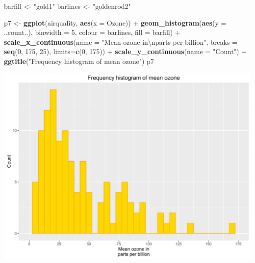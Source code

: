 \documentclass[]{article}
\newenvironment{Shaded}{\begin{snugshade}}{\end{snugshade}}
\newcommand{\KeywordTok}[1]{\textcolor[rgb]{0.13,0.29,0.53}{\textbf{{#1}}}}
\newcommand{\DataTypeTok}[1]{\textcolor[rgb]{0.13,0.29,0.53}{{#1}}}
\newcommand{\DecValTok}[1]{\textcolor[rgb]{0.00,0.00,0.81}{{#1}}}
\newcommand{\CharTok}[1]{\textcolor[rgb]{0.31,0.60,0.02}{{#1}}}
\newcommand{\StringTok}[1]{\textcolor[rgb]{0.31,0.60,0.02}{{#1}}}
\newcommand{\NormalTok}[1]{{#1}}
\begin{document}
\begin{Shaded}
\begin{Highlighting}[]
\NormalTok{barfill <-}\StringTok{ "gold1"}
\NormalTok{barlines <-}\StringTok{ "goldenrod2"}

\NormalTok{p7 <-}\StringTok{ }\KeywordTok{ggplot}\NormalTok{(airquality, }\KeywordTok{aes}\NormalTok{(}\DataTypeTok{x =} \NormalTok{Ozone)) +}\StringTok{ }
\StringTok{      }\KeywordTok{geom_histogram}\NormalTok{(}\KeywordTok{aes}\NormalTok{(}\DataTypeTok{y =} \NormalTok{..count..), }\DataTypeTok{binwidth =} \DecValTok{5}\NormalTok{,}
                     \DataTypeTok{colour =} \NormalTok{barlines, }\DataTypeTok{fill =} \NormalTok{barfill) +}
\StringTok{      }\KeywordTok{scale_x_continuous}\NormalTok{(}\DataTypeTok{name =} \StringTok{"Mean ozone in}\CharTok{\textbackslash{}n}\StringTok{parts per billion"}\NormalTok{,}
                         \DataTypeTok{breaks =} \KeywordTok{seq}\NormalTok{(}\DecValTok{0}\NormalTok{, }\DecValTok{175}\NormalTok{, }\DecValTok{25}\NormalTok{),}
                         \DataTypeTok{limits=}\KeywordTok{c}\NormalTok{(}\DecValTok{0}\NormalTok{, }\DecValTok{175}\NormalTok{)) +}
\StringTok{      }\KeywordTok{scale_y_continuous}\NormalTok{(}\DataTypeTok{name =} \StringTok{"Count"}\NormalTok{) +}
\StringTok{      }\KeywordTok{ggtitle}\NormalTok{(}\StringTok{"Frequency histogram of mean ozone"}\NormalTok{)}
\NormalTok{p7}
\end{Highlighting}
\end{Shaded}

\begin{center}\includegraphics{0_all_posts_pdf/histogram_9-1} \end{center}
\end{document}
